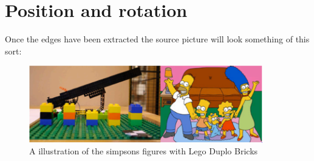 \chapter{Position and rotation}\label{ch:position_rotation}

Once the edges have been extracted the source picture will look something of this sort:

\begin{figure}[hb]
  \centering
  \includegraphics[width=4in]{figures/simpsonLegoBricks.png}
  \caption[Simpsons figures Lego Bricks] {A illustration of the simpsons figures with Lego Duplo Bricks}
\end{figure}

